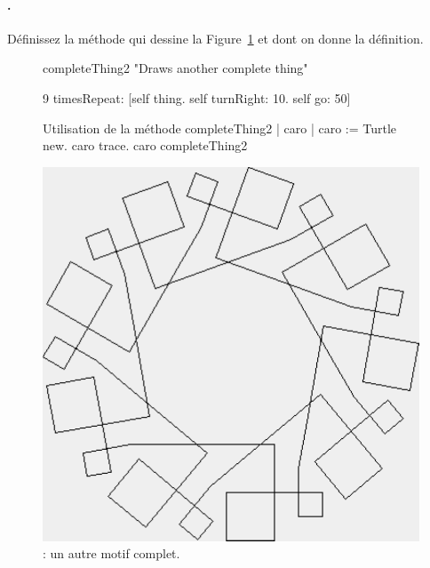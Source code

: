 \paragraph{.} D\'efinissez la m\'ethode  qui dessine la Figure~\ref{c7completething2} et dont on donne la d\'efinition.

\begin{figure} 
\begin{minipage}[c]{.55\linewidth}
\begin{nmethode}
completeThing2 "Draws another complete thing"

   9 timesRepeat: [self thing. 
                  self turnRight: 10. 
                  self go: 50]
\end{nmethode}
\begin{ncscript}{Utilisation de la m\'ethode completeThing2}
| caro |
caro := Turtle new.
caro trace.
caro completeThing2
\end{ncscript}
\end{minipage}
\hfill
\begin{minipage}[c]{.45\linewidth}
\centerline{\includegraphics[width=\linewidth]{c7completething2}}
\end{minipage}
\caption{ : un autre motif complet.}
\label{c7completething2}
\end{figure}

